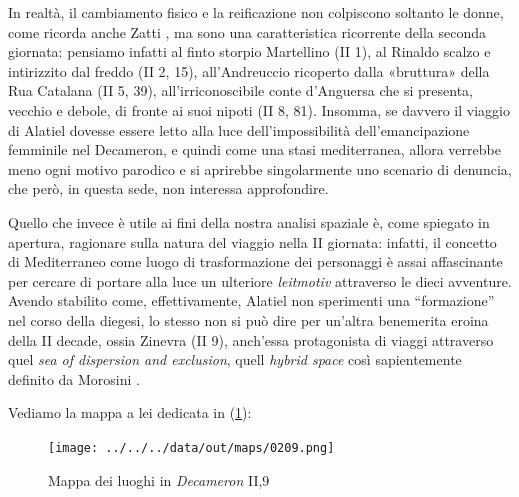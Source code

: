 In realtà, il cambiamento fisico e la reificazione non colpiscono
soltanto le donne, come ricorda anche Zatti \autocite{zatti2004}, ma
sono una caratteristica ricorrente della seconda giornata: pensiamo
infatti al finto storpio Martellino (II 1), al Rinaldo scalzo e
intirizzito dal freddo (II 2, 15), all'Andreuccio ricoperto dalla
«bruttura» della Rua Catalana (II 5, 39), all'irriconoscibile conte
d'Anguersa che si presenta, vecchio e debole, di fronte ai suoi nipoti
(II 8, 81). Insomma, se davvero il viaggio di Alatiel dovesse essere
letto alla luce dell'impossibilità dell'emancipazione femminile nel
Decameron, e quindi come una stasi mediterranea, allora verrebbe meno
ogni motivo parodico e si aprirebbe singolarmente uno scenario di
denuncia, che però, in questa sede, non interessa approfondire.

Quello che invece è utile ai fini della nostra analisi spaziale è, come
spiegato in apertura, ragionare sulla natura del viaggio nella II
giornata: infatti, il concetto di Mediterraneo come luogo di
trasformazione dei personaggi è assai affascinante per cercare di
portare alla luce un ulteriore \emph{leitmotiv} attraverso le dieci
avventure. Avendo stabilito come, effettivamente, Alatiel non sperimenti
una ``formazione'' nel corso della diegesi, lo stesso non si può dire
per un'altra benemerita eroina della II decade, ossia Zinevra (II 9),
anch'essa protagonista di viaggi attraverso quel \emph{sea of dispersion
and exclusion}, quell \emph{hybrid space} così sapientemente definito da
Morosini \autocite{morosini2016}.

Vediamo la mappa a lei dedicata in (\ref{fig:0209}):

\begin{figure}
\centering
\texttt{[image: ../../../data/out/maps/0209.png]}
\caption{Mappa dei luoghi in \emph{Decameron} II,9}\label{fig:0209}
\end{figure}
